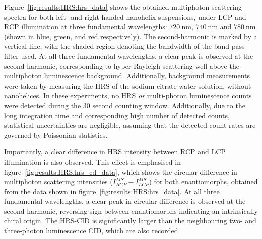 Figure~\ref{fig:results:HRS:hrs_data} shows the obtained multiphoton scattering spectra for both left- and right-handed nanohelix suspensions, under LCP and RCP illumination at three fundamental wavelengths: $\SI{720}{\nano\m}$, $\SI{740}{\nano\m}$ and $\SI{780}{\nano\m}$ (shown in blue, green, and red respectively). 
The second-harmonic is marked by a vertical line, with the shaded region denoting the bandwidth of the band-pass filter used. At all three fundamental wavelengths, a clear peak is observed at the second-harmonic, corresponding to hyper-Rayleigh scattering well above the multiphoton luminescence background. Additionally, background measurements were taken by measuring the HRS of the sodium-citrate water solution, without nanohelices. In these experiments, no HRS \textit{or} multi-photon luminescence counts were detected during the 30 second counting window.
Additionally, due to the long integration time and corresponding high number of detected counts, statistical uncertainties are negligible, assuming that the detected count rates are governed by Poissonian statistics.

Importantly, a clear difference in HRS intensity between RCP and LCP illumination is also observed. 
This effect is emphasised in figure~\ref{fig:results:HRS:hrs_cd_data}, which shows the circular difference in multiphoton scattering intensities ($I_{RCP}^{MS}-I_{LCP}^{MS}$) for both enantiomorphs, obtained from the data shown in figure~\ref{fig:results:HRS:hrs_data}. At all three fundamental wavelengths, a clear peak in circular difference is observed at the second-harmonic, reversing sign between enantiomorphs indicating an intrinsically chiral origin. The HRS-CID is significantly larger than the neighbouring two- and three-photon luminescence CID, which are also recorded. 

